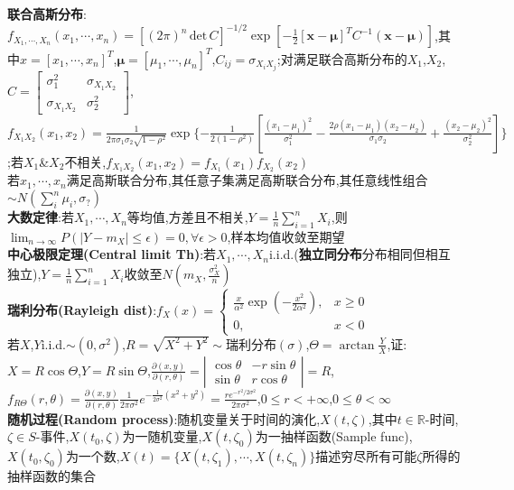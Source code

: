 \documentclass[UTF8,a4paper,10pt]{article}
\providecommand{\abs}[1]{\left\lvert#1\right\rvert}
\providecommand{\det}{\,\text{det}\,}
\begin{document}
\begin{multicols}{2}
    \textbf{联合高斯分布}:$f_{X_1,\cdots,X_n}(x_1,\cdots,x_n)=[(2\pi)^n\det C]^{-1/2}\exp[-\frac{1}{2}[\bm{x}-\bm{\mu}]^TC^{-1}(\bm{x}-\bm{\mu})]$,其中$x=[x_1,\cdots,x_n]^T$,$\bm{\mu}=[\mu_1,\cdots,\mu_n]^T$,$C_{ij}=\sigma_{X_iX_j}$;对满足联合高斯分布的$X_1$,$X_2$,$C=\left[\begin{smallmatrix}
        \sigma_1^2&\sigma_{X_1X_2}\\
        \sigma_{X_1X_2}&\sigma_2^2
    \end{smallmatrix}\right]$,$f_{X_1X_2}(x_1,x_2)=\frac{1}{2\pi\sigma_1\sigma_2\sqrt{1-\rho^2}}\exp\{-\frac{1}{2(1-\rho^2)}[\frac{(x_1-\mu_1)^2}{\sigma_1^2}-\frac{2\rho(x_1-\mu_1)(x_2-\mu_2)}{\sigma_1\sigma_2}+\frac{(x_2-\mu_2)^2}{\sigma_2^2}]\}$;若$X_1$\&$X_2$不相关,$f_{X_1X_2}(x_1,x_2)=f_{X_1}(x_1)f_{X_2}(x_2)$\\
    若$x_1,\cdots,x_n$满足高斯联合分布,其任意子集满足高斯联合分布,其任意线性组合$\sim N(\sum_i^n\mu_i,\sigma_?)$\\
    \textbf{大数定律}:若$X_1,\cdots,X_n$等均值,方差且不相关,$Y=\frac{1}{n}\sum_{i=1}^nX_i$,则$\lim_{n\rightarrow\infty}P(\abs{Y-m_X}\leq\epsilon)=0,\forall\epsilon>0$,样本均值收敛至期望\\
    \textbf{中心极限定理(Central limit Th)}:若$X_1,\cdots,X_n$i.i.d.(\textbf{独立同分布}分布相同但相互独立),$Y=\frac{1}{n}\sum_{i=1}^nX_i$收敛至$N(m_X,\frac{\sigma_X^2}{n})$\\
    \textbf{瑞利分布(Rayleigh dist)}:$f_X(x)=\left\{\begin{array}{ll}
        \frac{x}{\alpha^2}\exp(-\frac{x^2}{2\alpha^2}),&x\geq 0\\
        0,&x<0
    \end{array}\right.$\\
    若$X$,$Y$i.i.d.$\sim(0,\sigma^2)$,$R=\sqrt{X^2+Y^2}\sim$瑞利分布$(\sigma)$,$\Theta=\arctan\frac{Y}{X}$,证:$X=R\cos\Theta$,$Y=R\sin\Theta$,$\frac{\partial(x,y)}{\partial(r,\theta)}=\left\lvert\begin{smallmatrix}
        \cos\theta&-r\sin\theta\\
        \sin\theta&r\cos\theta
    \end{smallmatrix}\right\rvert=R$,$f_{R\Theta}(r,\theta)=\frac{\partial(x,y)}{\partial(r,\theta)}\frac{1}{2\pi\sigma^2}e^{-\frac{1}{2\sigma^2}(x^2+y^2)}=\frac{re^{-r^2/2\sigma^2}}{2\pi\sigma^2}$,$0\leq r<+\infty$,$0\leq\theta<\infty$\\
    \textbf{随机过程(Random process)}:随机变量关于时间的演化,$X(t,\zeta)$,其中$t\in\mathbb{R}$-时间,$\zeta\in S$-事件,$X(t_0,\zeta)$为一随机变量,$X(t,\zeta_0)$为一抽样函数(Sample func),$X(t_0,\zeta_0)$为一个数,$X(t)=\{X(t,\zeta_1),\cdots,X(t,\zeta_n)\}$描述穷尽所有可能$\zeta$所得的抽样函数的集合\\

\end{multicols}
\end{document}
